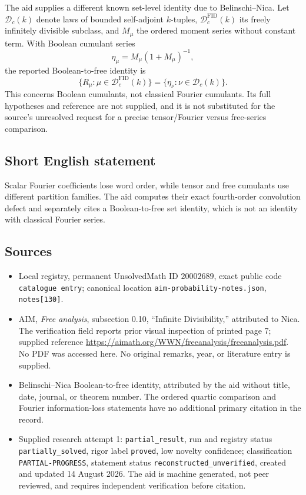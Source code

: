 \documentclass[11pt]{article}
\begin{document}
The aid supplies a different known set-level identity due to Belinschi--Nica. Let \(\mathcal D_c(k)\) denote laws of bounded self-adjoint \(k\)-tuples, \(\mathcal D_c^{\mathrm{FID}}(k)\) its freely infinitely divisible subclass, and \(M_\mu\) the ordered moment series without constant term. With Boolean cumulant series
\[
 \eta_\mu=M_\mu(1+M_\mu)^{-1},
\]
the reported Boolean-to-free identity is
\[
 \{R_\mu:\mu\in\mathcal D_c^{\mathrm{FID}}(k)\}
 =\{\eta_\nu:\nu\in\mathcal D_c(k)\}.
\]
This concerns Boolean cumulants, not classical Fourier cumulants. Its full hypotheses and reference are not supplied, and it is not substituted for the source's unresolved request for a precise tensor/Fourier versus free-series comparison.
\subsection{Short English statement}
Scalar Fourier coefficients lose word order, while tensor and free cumulants use different partition families. The aid computes their exact fourth-order convolution defect and separately cites a Boolean-to-free set identity, which is not an identity with classical Fourier series.
\subsection{Sources}
\begin{itemize}
\item Local registry, permanent UnsolvedMath ID \(20002689\), exact public code \texttt{catalogue entry}; canonical location \texttt{aim-probability-notes.json}, \texttt{notes[130]}.
\item AIM, \emph{Free analysis}, subsection 0.10, ``Infinite Divisibility,'' attributed to Nica. The verification field reports prior visual inspection of printed page 7; supplied reference \url{https://aimath.org/WWN/freeanalysis/freeanalysis.pdf}. No PDF was accessed here. No original remarks, year, or literature entry is supplied.
\item Belinschi--Nica Boolean-to-free identity, attributed by the aid without title, date, journal, or theorem number. The ordered quartic comparison and Fourier information-loss statements have no additional primary citation in the record.
\item Supplied research attempt 1: \texttt{partial\_result}, run and registry status \texttt{partially\_solved}, rigor label \texttt{proved}, low novelty confidence; classification \texttt{PARTIAL-PROGRESS}, statement status \texttt{reconstructed\_unverified}, created and updated 14 August 2026. The aid is machine generated, not peer reviewed, and requires independent verification before citation.
\end{itemize}
\end{document}
